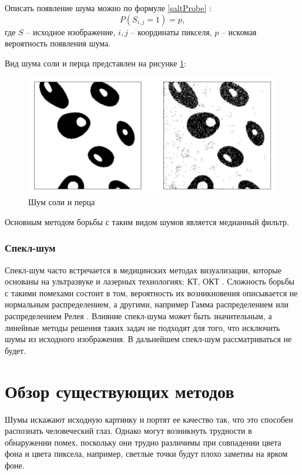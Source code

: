 Описать появление шума можно по формуле \eqref{saltProbe} \cite{moments}: 
\begin{equation}
	\label{saltProbe}
	P(S_{i, j} = 1) = p,
\end{equation}
где $S$ -- исходное изображение, $i, j$ -- координаты пикселя, $p$ -- искомая вероятность появления шума. 

Вид шума соли и перца представлен на рисунке \ref{fig::salt}:
\FloatBarrier
\begin{figure}[h]	
	\begin{center}
		\includegraphics[width=\linewidth]{inc/png/salt.png}
	\end{center}
\captionsetup{justification=centering}
	\caption{Шум соли и перца}
	\label{fig::salt}
\end{figure}
\FloatBarrier

Основным методом борьбы с таким видом шумов является медианный фильтр.

\subsubsection{Спекл-шум}
Спекл-шум часто встречается в медицинских методах визуализации, которые основаны на ультразвуке и лазерных технологиях: КТ, ОКТ \cite{speckle}. 
Сложность борьбы с такими помехами состоит в том, вероятность их возникновения описывается не нормальным распределением, а другими, например Гамма распределением или распределением Релея \cite{speckle2}.
Влияние спекл-шума может быть значительным, а линейные методы решения таких задач не подходят для того, что исключить шумы из исходного изображения. 
В дальнейшем спекл-шум рассматриваться не будет.


\newpage
\section{Обзор существующих методов}
Шумы искажают исходную картинку и портят ее качество так, что это способен распознать человеческий глаз.
Однако могут возникнуть трудности в обнаружении помех, поскольку они трудно различимы при совпадении цвета фона и цвета пиксела, например, светлые точки будут плохо заметны на ярком фоне.

